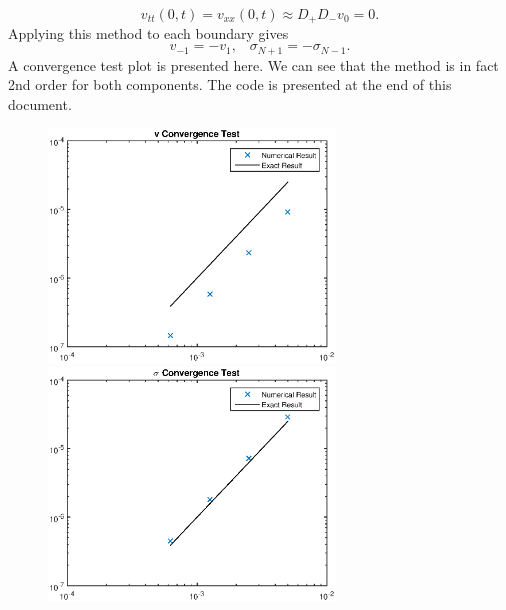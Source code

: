 $$v_{tt}(0,t)=v_{xx}(0,t)\approx D_+D_- v_0=0.$$
Applying this method to each boundary gives
$$v_{-1}=-v_1,\;\;\; \sigma_{N+1}=-\sigma_{N-1}.$$
A convergence test plot is presented here. We can see that the method is in fact 2nd order for both components. The code is presented at the end of this document.
\begin{figure}[h]
\centering
\includegraphics[width=3in]{colVConv}
\includegraphics[width=3in]{colSConv}
\end{figure}

